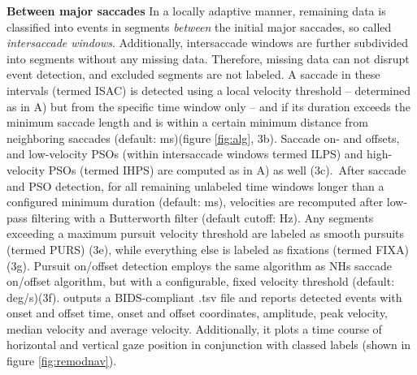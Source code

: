     \textbf{Between major saccades} In a locally adaptive manner, remaining data is classified into events in segments
    \textit{between} the initial major saccades, so called \textit{intersaccade windows}. Additionally, intersaccade
    windows are further subdivided into segments without any missing data. Therefore, missing data can not disrupt event
    detection, and excluded segments are not labeled. A saccade in these intervals (termed ISAC) is detected using a
    local velocity threshold -- determined as in A) but from the specific time window only -- and if its duration exceeds
    the minimum saccade length and is within a certain minimum distance from neighboring saccades (default:
    \unit[130]{ms})(figure \ref{fig:alg}, 3b). Saccade on- and offsets, and low-velocity PSOs (within intersaccade
    windows termed ILPS) and high-velocity PSOs (termed IHPS) are computed as in A) as well (3c).\
    After saccade and PSO detection, for all remaining unlabeled time windows longer than a configured minimum duration
    (default: \unit[40]{ms}), velocities are recomputed after low-pass filtering with a Butterworth filter (default
    cutoff: \unit[4]{Hz}). Any segments exceeding a maximum pursuit velocity threshold are labeled as smooth pursuits
    (termed PURS) (3e), while everything else is labeled as fixations (termed FIXA)(3g). Pursuit on/offset detection
    employs the same algorithm as NHs saccade on/offset algorithm, but with a configurable, fixed velocity threshold
    (default: \unit[2]{deg/s})(3f). \remodnav outputs a BIDS-compliant \citep{gorgolewski2016brain} .tsv file and
    reports detected events with onset and offset time, onset and offset coordinates, amplitude, peak velocity, median
    velocity and average velocity. Additionally, it plots a time course of horizontal and vertical gaze position in
    conjunction with classed labels (shown in figure \ref{fig:remodnav}).





